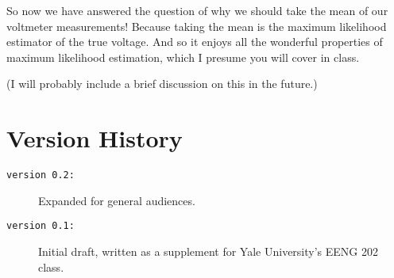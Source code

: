 \documentclass[10pt,letterpaper]{article}
\begin{document}
So now we have answered the question of why we should take the mean of our voltmeter measurements! Because taking the mean is the maximum likelihood estimator of the true voltage. And so it enjoys all the wonderful properties of maximum likelihood estimation, which I presume you will cover in class. 

(\textsf{I will probably include a brief discussion on this in the future.})

\section{Version History}
\begin{description}
	\item[\texttt{version 0.2:}] Expanded for general audiences.
	\item[\texttt{version 0.1:}] Initial draft, written as a supplement for Yale University's EENG 202 class.
\end{description}
\end{document}
